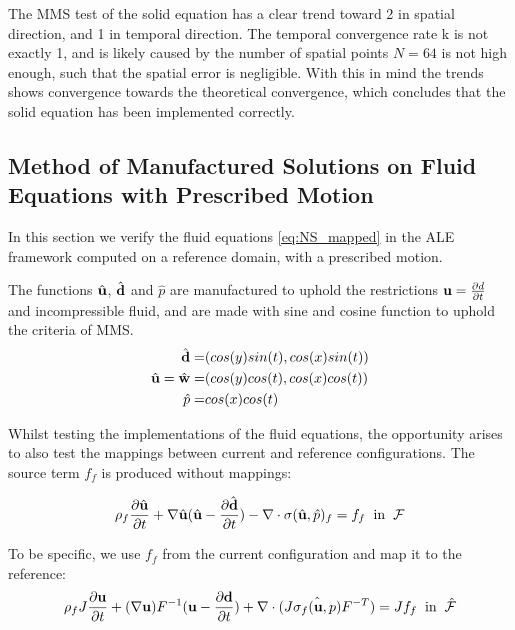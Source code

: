 The MMS test of the solid equation has a clear trend toward 2 in spatial direction, and 1 in temporal direction. The temporal convergence rate k is not exactly 1, and is likely caused by the number of spatial points $N=64$ is not high enough, such that the spatial error is negligible. With this in mind the trends shows convergence towards the theoretical convergence, which concludes that the solid equation has been implemented correctly.

\subsection{Method of Manufactured Solutions on Fluid Equations with Prescribed Motion}
In this section we verify the fluid equations \eqref{eq:NS_mapped} in the ALE framework computed on a reference domain, with a prescribed motion.

The functions $\hat{\bold{u}}$, $\hat{\bold{d}}$ and $\hat{p}$ are manufactured to uphold the restrictions $\bold{u}=\frac{\partial d}{\partial t}$ and incompressible fluid, and are made with sine and cosine function to uphold the criteria of MMS. 
\begin{align*}
\hat{\bold{d}} =& ( cos(y)sin(t) , cos(x)sin(t) )\\
\hat{\bold{u}} = \hat{\bold{w}}=& ( cos(y)cos(t), cos(x)cos(t) ) \\
\hat{p} =& cos(x)cos(t)
\end{align*}

Whilst testing the implementations of the fluid equations, the opportunity arises to also test the mappings between current and reference configurations.
The source term $f_f$ is produced without mappings:

$$ \rho_f \frac{\partial \hat{\bold{u}}}{\partial t}  +  \nabla \hat{\bold{u}} (\hat{\bold{u}} - \frac{\partial \hat{\bold{d}}}{\partial t})  -  \nabla \cdot \sigma(\hat{\bold{u}}, \hat{p})_f  = f_f \hspace{2mm} \text{in} \hspace{2mm} \mathcal{F} $$

To be specific, we use $f_f$ from the current configuration and map it to the reference:
$$ \rho_f J \frac{\partial \bold{u}}{\partial t} + (\nabla \bold{u})F^{-1}(\bold{u}-\frac{\partial \bold{d}}{\partial t})  + \nabla \cdot( J \hat{\sigma_f(\bold{u},p)} F^{-T}) = J f_f \hspace{2mm} \text{in} \hspace{2mm} \hat{\mathcal{F}}$$

